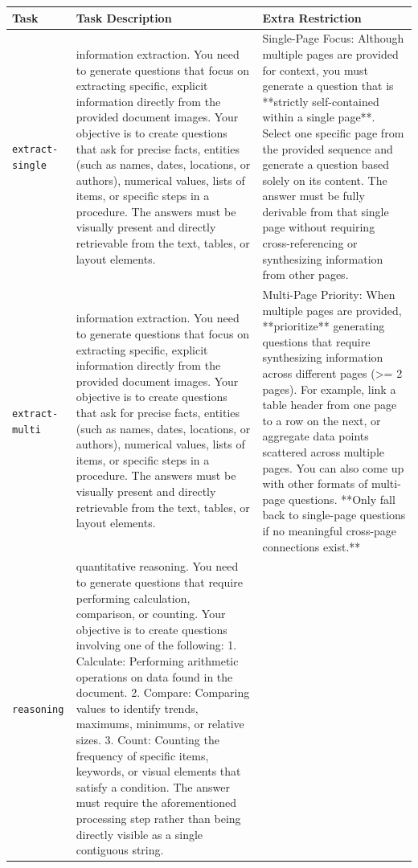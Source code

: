 \documentclass{llmxive}
\providecommand{\extractsingle}{\texttt{extract-single}\xspace}
\providecommand{\extractmulti}{\texttt{extract-multi}\xspace}
\providecommand{\reasoningtask}{\texttt{reasoning}\xspace}
\begin{document}
{{{\begin{table}[!htbp]
 \centering
 \small
 \setlength{\tabcolsep}{4pt}
 \begin{tabular}{L{2.3cm}L{5.6cm}L{6.4cm}}
 \toprule
 \textbf{Task} & \textbf{Task Description} & \textbf{Extra Restriction} \\
 \midrule
 \extractsingle
 & information extraction. You need to generate questions that focus on extracting specific, explicit information directly from the provided document images. Your objective is to create questions that ask for precise facts, entities (such as names, dates, locations, or authors), numerical values, lists of items, or specific steps in a procedure. The answers must be visually present and directly retrievable from the text, tables, or layout elements.
 & Single-Page Focus: Although multiple pages are provided for context, you must generate a question that is **strictly self-contained within a single page**. Select one specific page from the provided sequence and generate a question based solely on its content. The answer must be fully derivable from that single page without requiring cross-referencing or synthesizing information from other pages. \\
 \addlinespace
 \midrule
 \extractmulti
 & information extraction. You need to generate questions that focus on extracting specific, explicit information directly from the provided document images. Your objective is to create questions that ask for precise facts, entities (such as names, dates, locations, or authors), numerical values, lists of items, or specific steps in a procedure. The answers must be visually present and directly retrievable from the text, tables, or layout elements.
 & Multi-Page Priority: When multiple pages are provided, **prioritize** generating questions that require synthesizing information across different pages (>= 2 pages). For example, link a table header from one page to a row on the next, or aggregate data points scattered across multiple pages. You can also come up with other formats of multi-page questions. **Only fall back to single-page questions if no meaningful cross-page connections exist.** \\
 \addlinespace
 \midrule
 \reasoningtask
 & quantitative reasoning. You need to generate questions that require performing calculation, comparison, or counting. Your objective is to create questions involving one of the following: 1. Calculate: Performing arithmetic operations on data found in the document. 2. Compare: Comparing values to identify trends, maximums, minimums, or relative sizes. 3. Count: Counting the frequency of specific items, keywords, or visual elements that satisfy a condition. The answer must require the aforementioned processing step rather than being directly visible as a single contiguous string.

\end{tabular}
\end{table}}}}
\end{document}
